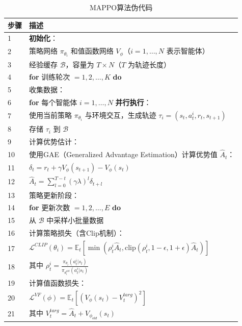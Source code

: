 \begin{table}[!ht]
\centering
\caption{MAPPO算法伪代码}
\label{tab:mappo}
\begin{tabular}{lp{}}
\toprule
\textbf{步骤} & \textbf{描述} \\
\midrule
1 & \textbf{初始化}：\\
2 & \quad \quad 策略网络 $\pi_{\theta_i}$ 和值函数网络 $V_{\phi}$（$i=1,\dots,N$ 表示智能体）\\
3 & \quad \quad 经验缓存 $\mathcal{B}$，容量为 $T \times N$（$T$ 为轨迹长度）\\
  
4 & \textbf{for} 训练轮次 $= 1, 2, \dots, K$ \textbf{do} \\
5 & \quad 收集数据：\\
6 & \quad \quad \textbf{for} 每个智能体 $i=1,\dots,N$ \textbf{并行执行}：\\
7 & \quad \quad \quad 使用当前策略 $\pi_{\theta_i}$ 与环境交互，生成轨迹 $\tau_i = (s_t, a_t^i, r_t, s_{t+1})$\\
8 & \quad \quad \quad 存储 $\tau_i$ 到 $\mathcal{B}$\\

9 & \quad 计算优势估计：\\
10 & \quad \quad 使用GAE（Generalized Advantage Estimation）计算优势值 $\hat{A}_t$：\\
11 & \quad \quad $\delta_t = r_t + \gamma V_{\phi}(s_{t+1}) - V_{\phi}(s_t)$\\
12 & \quad \quad $\hat{A}_t = \sum_{l=0}^{T-t} (\gamma \lambda)^l \delta_{t+l}$\\

13 & \quad 策略更新阶段：\\
14 & \quad \quad \textbf{for} 更新次数 $= 1, 2, \dots, E$ \textbf{do} \\
15 & \quad \quad \quad 从 $\mathcal{B}$ 中采样小批量数据\\
16 & \quad \quad \quad 计算策略损失（含Clip机制）：\\
17 & \quad \quad $\mathcal{L}^{CLIP}(\theta_i) = \mathbb{E}_t\left[\min\left( \rho_t^i \hat{A}_t, \text{clip}(\rho_t^i, 1-\epsilon, 1+\epsilon) \hat{A}_t \right)\right]$\\
18 & \quad \quad \quad 其中 $\rho_t^i = \frac{\pi_{\theta_i}(a_t^i|s_t)}{\pi_{\theta_{i}^{old}}(a_t^i|s_t)}$\\

19 & \quad \quad \quad 计算值函数损失：\\
20 & \quad \quad $\mathcal{L}^{VF}(\phi) = \mathbb{E}_t\left[ (V_{\phi}(s_t) - V_t^{targ})^2 \right]$\\
21  & \quad \quad \quad 其中 $V_t^{targ} = \hat{A}_t + V_{\phi_{old}}(s_t)$\\


\end{tabular}
\end{table}
